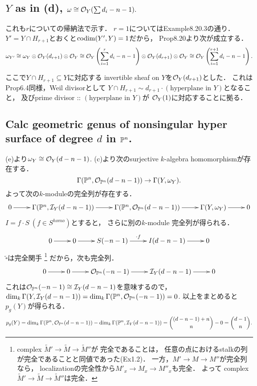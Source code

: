 \documentclass[a4paper]{jsarticle}
\newcommand{\shCano}{\omega}
\begin{document}
    \subsection{$Y$ as in (d), $\shCano \iso \shO_Y(\sum d_i-n-1).$}
    これも$r$についての帰納法で示す．
    $r=1$についてはExample8.20.3の通り．
    $Y'=Y \cap H_{r+1}$とおくと$\operatorname{codim}(Y', Y)=1$だから，
    Prop8.20より次が成立する．
    \[
        \shCano_{Y'}
        \iso \shCano_Y \otimes \shO_Y(d_{r+1}) \otimes \shO_Y
        \iso \shO_Y \left(\sum_{i=1}^r d_i-n-1 \right) \otimes \shO_Y(d_{r+1}) \otimes \shO_Y
        \iso \shO_Y \left(\sum_{i=1}^{r+1} d_i-n-1 \right).
    \]

    ここで$Y \cap H_{r+1} \subseteq Y$に対応する
    invertible sheaf on $Y$を$\mathcal{O}_Y(d_{r+1})$とした．
    これはProp6.4同様，Weil divisorとして
    $Y \cap H_{r+1} \sim d_{r+1} \cdot (\text{hyperplane in $Y$})$となること，
    及びprime divisor :: $(\text{hyperplane in $Y$})$が
    $\mathcal{O}_Y(1)$に対応することに拠る．

    \subsection{Calc geometric genus of nonsingular hyper surface of degree $d$ in $\mathbb{P}^n$.}
    (e)より$\shCano_Y \iso \shO_Y(d-n-1)$.
    (c)より次のsurjective $k$-algebra homomorphismが存在する．
    \[ \Gamma(\proj^n, \shO_{\proj^n}(d-n-1)) \to \Gamma(Y, \shCano_Y). \]
    よって次の$k$-moduleの完全列が存在する．
    \[
    \xymatrix@R=10pt
    {
        0 \ar[r]
        & \Gamma(\proj^n, \shI_Y(d-n-1)) \ar[r]
        & \Gamma(\proj^n, \shO_{\proj^n}(d-n-1)) \ar[r]
        & \Gamma(Y, \shCano_Y) \ar[r]
        & 0
    }
    \]
    $I=f \cdot S \ (f \in S^{homo})$とすると，
    さらに別の$k$-module 完全列が得られる．
    \[
    \xymatrix
    {
        0 \ar[r]& 0 \ar[r]& S(-n-1) \ar[r]^-{\cdot f}& I(d-n-1) \ar[r]& 0
    }
    \]
    $\tilde{\square}$は完全関手
    \footnote
    {
        complex $\tilde{M}' \to \tilde{M} \to \tilde{M}''$が
        完全であることは，
        任意の点におけるstalkの列が完全であることと同値であった(Ex1.2)．
        一方，$M' \to M \to M''$が完全列なら，
        localizationの完全性から$M'_x \to M_x \to M''_x$も完全．
        よって
        complex $\tilde{M}' \to \tilde{M} \to \tilde{M}''$は完全．
    }
    だから，次も完全列．
    \[
    \xymatrix
    {
        0 \ar[r]& 0 \ar[r]& \shO_{\proj^n}(-n-1) \ar[r]& \shI_Y(d-n-1) \ar[r]& 0
    }
    \]
    これは$\mathcal{O}_{\mathbb{P}^n}(-n-1) \cong \mathcal{I}_Y(d-n-1)$を意味するので，
    $\dim_k \Gamma(Y, \mathcal{I}_Y(d-n-1))=\dim_k \Gamma(\mathbb{P}^n, \mathcal{O}_{\mathbb{P}^n}(-n-1))=0$.
    以上をまとめると$p_g(Y)$が得られる．
    \[
        p_g(Y)
        =\dim_k \Gamma(\mathbb{P}^n, \mathcal{O}_{\mathbb{P}^n}(d-n-1))-\dim_k \Gamma(\mathbb{P}^n, \mathcal{I}_Y(d-n-1))
        =\binom{(d-n-1)+n}{n}-0
        =\binom{d-1}{n}.
    \]
\end{document}
